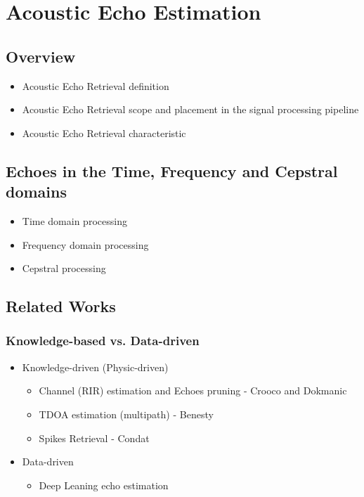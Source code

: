 \chapter{Acoustic Echo Estimation}\label{chap:estimation}

\section{Overview}
\begin{itemize}
    \item Acoustic Echo Retrieval definition
    \item Acoustic Echo Retrieval scope and placement in the signal processing pipeline
    \item Acoustic Echo Retrieval characteristic
\end{itemize}

\section{Echoes in the Time, Frequency and Cepstral domains}
\begin{itemize}
    \item Time domain processing
    \item Frequency domain processing
    \item Cepstral processing
\end{itemize}


\section{Related Works}
\subsection{Knowledge-based vs. Data-driven}
\begin{itemize}
    \item Knowledge-driven (Physic-driven)
    \begin{itemize}
        \item Channel (RIR) estimation and Echoes pruning - Crooco and Dokmanic
        \item TDOA estimation (multipath) - Benesty
        \item Spikes Retrieval - Condat
    \end{itemize}
    \item Data-driven
    \begin{itemize}
        \item Deep Leaning echo estimation
    \end{itemize}
\end{itemize}

